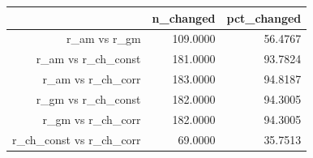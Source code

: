 \begin{table}[ht]
\centering
\begin{tabular}{rrr}
  \hline
 & n\_changed & pct\_changed \\
  \hline
r\_am vs r\_gm & 109.0000 & 56.4767 \\
  r\_am vs r\_ch\_const & 181.0000 & 93.7824 \\
  r\_am vs r\_ch\_corr & 183.0000 & 94.8187 \\
  r\_gm vs r\_ch\_const & 182.0000 & 94.3005 \\
  r\_gm vs r\_ch\_corr & 182.0000 & 94.3005 \\
  r\_ch\_const vs r\_ch\_corr & 69.0000 & 35.7513 \\
   \hline
\end{tabular}
\end{table}
